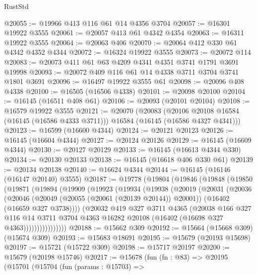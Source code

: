 \begin{lexlean}{RustStd}
\begin{coremodule}
@20055 := @19966 @413 @116 @61 @14 @4356 @3704
@20057 := @16301 @19922 @3555
@20061 := @20057 @413 @61 @4342 @4354
@20063 := @16311 @19922 @3555
@20064 := @20063 @406
@20070 := @20064 @412 @330 @61 @4342 @4352 @4344
@20072 := @16324 @19922 @3555
@20073 := @20072 @114
@20083 := @20073 @411 @61 @63 @4209 @4341 @4351 @3741 @1791 @3691 @19998
@20093 := @20072 @409 @116 @61 @14 @4338 @3711 @3704 @3741 @1801 @3691
@20096 := @16497 @19922 @3555 @61
@20098 := @20096 @408 @4338
@20100 := @16505 (@16506 @4338)
@20101 := @20098 @20100
@20104 := @16145 (@16511 @408 @61)
@20106 := @20093 (@20101 @20104)
@20108 := @16579 @19922 @3555
@20121 := @20070
    (@20083
      (@20106 @20108 @16584 (@16145 (@16586 @4333 @3711)))
      @16584
      (@16145 (@16586 @4327 @4341)))
@20123 := @16599 (@16600 @4344)
@20124 := @20121 @20123
@20126 := @16145 (@16604 @4344)
@20127 := @20124 @20126
@20129 := @16145 (@16609 @4344)
@20130 := @20127 @20129
@20133 := @16145 (@16613 @4344 @330)
@20134 := @20130 @20133
@20138 := @16145 (@16618 @406 @330 @61)
@20139 := @20134 @20138
@20140 := @16624 @4344
@20144 := @16145 (@16146 (@16147 @20140) @3555)
@20187 := @19778
    (@19804
      (@19846
        (@19848
          (@19850
            (@19871
              (@19894
                (@19909
                  (@19923
                    (@19934
                      (@19938
                        (@20019
                          (@20031
                            (@20036
                              (@20046
                                (@20049 (@20055 (@20061 (@20139 @20144)) @20001))
                                (@16402 (@16659 @327 @3738))))
                            (@20032
                              @419
                              @327
                              @3711
                              @4365
                              (@20038
                                @166
                                @327
                                @116
                                @14
                                @3711
                                @3704
                                @4363
                                @16282
                                @20108
                                (@16402 (@16698 @327 @4363))))))))))))))))
@20188 := @15662 @309
@20192 := @15664 (@15668 @309) (@15674 @309)
@20193 := @15683 @18691
@20195 := @15679 (@20193 @15698)
@20197 := @15721 (@15722 @309)
@20198 := @15717 @20197
@20200 := @15679 (@20198 @15746)
@20217 := @15678
    (fun (fn : @83) =>
    @20195
      (@15701
        (@15704
          (fun (params : @15703) =>

\end{coremodule}
\end{lexlean}
